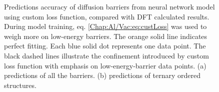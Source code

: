 \begingroup
\begin{figure}[!ht]
  \centering
\caption[Predictions accuracy of diffusion barriers from neural network model using custom loss function, compared with DFT calculated results.]{Predictions accuracy of diffusion barriers from neural network model using custom loss function, compared with DFT calculated results. During model training, eq. \ref{Chap:Al/Vac:eq:custLoss} was used to weigh more on low-energy barriers. The orange solid line indicates perfect fitting. Each blue solid dot represents one data point. The black dashed lines illustrate the confinement introduced by custom loss function with emphasis on low-energy-barrier data points. (a) predictions of all the barriers. (b) predictions of ternary ordered structures.}
\label{Chap:Al/Vac:fig:fitting_all_weighted}
\end{figure}
\endgroup